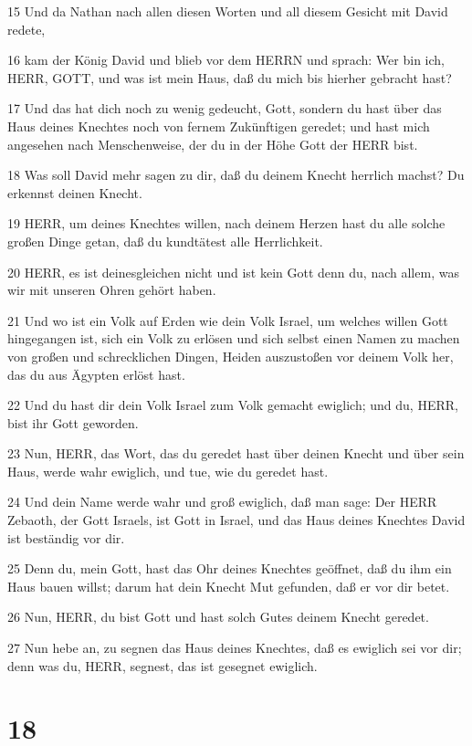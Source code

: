 \par 15 Und da Nathan nach allen diesen Worten und all diesem Gesicht mit David redete,
\par 16 kam der König David und blieb vor dem HERRN und sprach: Wer bin ich, HERR, GOTT, und was ist mein Haus, daß du mich bis hierher gebracht hast?
\par 17 Und das hat dich noch zu wenig gedeucht, Gott, sondern du hast über das Haus deines Knechtes noch von fernem Zukünftigen geredet; und hast mich angesehen nach Menschenweise, der du in der Höhe Gott der HERR bist.
\par 18 Was soll David mehr sagen zu dir, daß du deinem Knecht herrlich machst? Du erkennst deinen Knecht.
\par 19 HERR, um deines Knechtes willen, nach deinem Herzen hast du alle solche großen Dinge getan, daß du kundtätest alle Herrlichkeit.
\par 20 HERR, es ist deinesgleichen nicht und ist kein Gott denn du, nach allem, was wir mit unseren Ohren gehört haben.
\par 21 Und wo ist ein Volk auf Erden wie dein Volk Israel, um welches willen Gott hingegangen ist, sich ein Volk zu erlösen und sich selbst einen Namen zu machen von großen und schrecklichen Dingen, Heiden auszustoßen vor deinem Volk her, das du aus Ägypten erlöst hast.
\par 22 Und du hast dir dein Volk Israel zum Volk gemacht ewiglich; und du, HERR, bist ihr Gott geworden.
\par 23 Nun, HERR, das Wort, das du geredet hast über deinen Knecht und über sein Haus, werde wahr ewiglich, und tue, wie du geredet hast.
\par 24 Und dein Name werde wahr und groß ewiglich, daß man sage: Der HERR Zebaoth, der Gott Israels, ist Gott in Israel, und das Haus deines Knechtes David ist beständig vor dir.
\par 25 Denn du, mein Gott, hast das Ohr deines Knechtes geöffnet, daß du ihm ein Haus bauen willst; darum hat dein Knecht Mut gefunden, daß er vor dir betet.
\par 26 Nun, HERR, du bist Gott und hast solch Gutes deinem Knecht geredet.
\par 27 Nun hebe an, zu segnen das Haus deines Knechtes, daß es ewiglich sei vor dir; denn was du, HERR, segnest, das ist gesegnet ewiglich.

\chapter{18}

